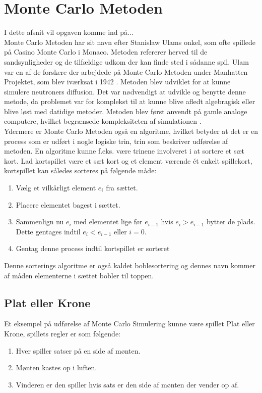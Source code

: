 \documentclass[../../SRP.tex]{subfiles}
\begin{document}
\chapter{Monte Carlo Metoden}

I dette afsnit vil opgaven komme ind på... \\

Monte Carlo Metoden har sit navn efter Stanislaw Ulams onkel, som ofte spillede på Casino Monte Carlo i Monaco. Metoden refererer herved til de sandsynligheder og de tilfældige udkom der kan finde sted i sådanne spil. Ulam var en af de forskere der arbejdede på Monte Carlo Metoden under Manhatten Projektet, som blev iværksat i 1942 \cite{MSD}. Metoden blev udviklet for at kunne simulere neutroners diffusion. Det var nødvendigt at udvikle og benytte denne metode, da problemet var for komplekst til at kunne blive afledt algebragisk eller blive løst med datidige metoder. Metoden blev først anvendt på gamle analoge computere, hvilket begrænsede kompleksiteten af simulationen \cite{AHF}. \\

Ydermere er Monte Carlo Metoden også en algoritme, hvilket betyder at det er en process som er udført i nogle logiske trin, trin som beskriver udførelse af metoden. En algoritme kunne f.eks. være trinene involveret i at sortere et sæt kort. Lad kortspillet være et sæt kort og et element værende ét enkelt spillekort, kortspillet kan således sorteres på følgende måde:
\begin{enumerate}
  \item Vælg et vilkårligt element $e_i$ fra sættet.
  
  \item Placere elementet bagest i sættet.

  \item Sammenlign nu $e_i$ med elementet lige før $e_{i-1}$ hvis $e_i > e_{i-1}$ bytter de plads. Dette gentages indtil $e_i < e_{i-1}$ eller $i = 0$.

  \item Gentag denne process indtil kortspillet er sorteret
\end{enumerate}
Denne sorterings algoritme er også kaldet boblesortering og dennes navn kommer af måden elementerne i sættet bobler til toppen. \cite{BS} \\

\section{Plat eller Krone}
Et eksempel på udførelse af Monte Carlo Simulering kunne være spillet Plat eller Krone, spillets regler er som følgende:
\begin{enumerate}
  \item Hver spiller satser på en side af mønten.

  \item Mønten kastes op i luften.

  \item Vinderen er den spiller hvis sats er den side af mønten der vender op af.
\end{enumerate}
\end{document}
